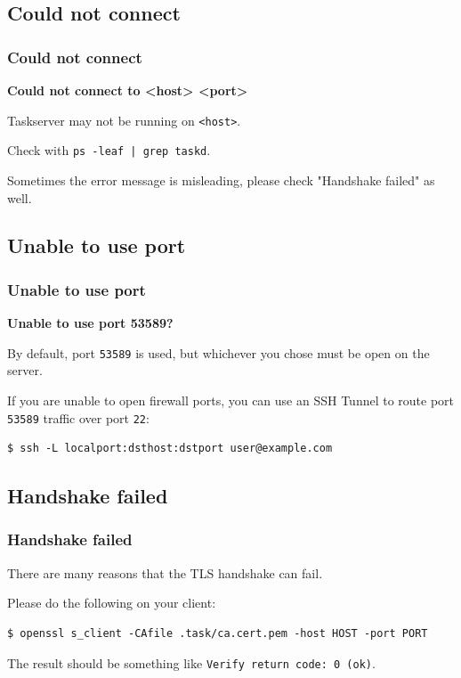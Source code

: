 \documentclass[t,handout]{beamer}
\begin{document}
\subsection{Could not connect}

\begin{frame}[fragile]\frametitle{Could not connect}
    \vfill
    \textbf{Could not connect to <host> <port>}

    Taskserver may not be running on \verb+<host>+.

    Check with \verb+ps -leaf | grep taskd+.

    Sometimes the error message is misleading, please check "Handshake failed" as well.
\end{frame}

\subsection{Unable to use port}

\begin{frame}[fragile]\frametitle{Unable to use port}
    \vfill
    \textbf{Unable to use port 53589?}

    By default, port \verb+53589+ is used, but whichever you chose must be open on the server.

    If you are unable to open firewall ports, you can use an SSH Tunnel to route port \verb+53589+ traffic over port \verb+22+:

    \begin{lstlisting}
$ ssh -L localport:dsthost:dstport user@example.com\end{lstlisting}
\end{frame}

\subsection{Handshake failed}

\begin{frame}[fragile]\frametitle{Handshake failed}
    \vfill
    There are many reasons that the TLS handshake can fail.

    Please do the following on your client:

    \begin{lstlisting}
$ openssl s_client -CAfile .task/ca.cert.pem -host HOST -port PORT\end{lstlisting}

    The result should be something like \verb=Verify return code: 0 (ok)=.
\end{frame}
\end{document}
